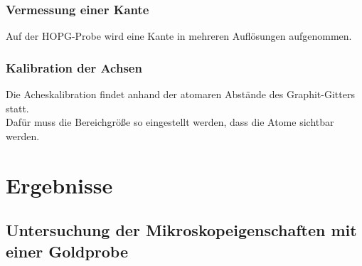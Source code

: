 \documentclass[12pt,a4paper]{article}
\begin{document}
\subsubsection{Vermessung einer Kante}
Auf der HOPG-Probe wird eine Kante in mehreren Auflösungen aufgenommen.

\subsubsection{Kalibration der Achsen}
Die Acheskalibration findet anhand der atomaren Abstände des Graphit-Gitters statt.\\
Dafür muss die Bereichgröße so eingestellt werden, dass die Atome sichtbar werden.

\section{Ergebnisse}
\subsection{Untersuchung der Mikroskopeigenschaften mit einer Goldprobe}
\end{document}
